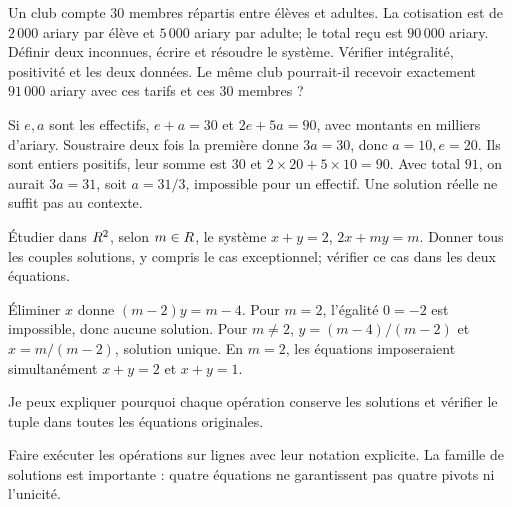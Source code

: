 \label{t11s-c09-p01}
Un club compte $30$ membres répartis entre élèves et adultes. La cotisation est de $2\,000$ ariary par élève et $5\,000$ ariary par adulte; le total reçu est $90\,000$ ariary. Définir deux inconnues, écrire et résoudre le système. Vérifier intégralité, positivité et les deux données. Le même club pourrait-il recevoir exactement $91\,000$ ariary avec ces tarifs et ces $30$ membres ?
\begin{corrige}\label{sol-t11s-c09-p01}
Si $e,a$ sont les effectifs, $e+a=30$ et $2e+5a=90$, avec montants en milliers d’ariary. Soustraire deux fois la première donne $3a=30$, donc $a=10,e=20$. Ils sont entiers positifs, leur somme est $30$ et $2\times20+5\times10=90$. Avec total $91$, on aurait $3a=31$, soit $a=31/3$, impossible pour un effectif. Une solution réelle ne suffit pas au contexte.
\end{corrige}
\label{t11s-c09-p02}
Étudier dans $R^2$, selon $m\in R$, le système $x+y=2$, $2x+my=m$. Donner tous les couples solutions, y compris le cas exceptionnel; vérifier ce cas dans les deux équations.
\begin{corrige}\label{sol-t11s-c09-p02}
Éliminer $x$ donne $(m-2)y=m-4$. Pour $m=2$, l’égalité $0=-2$ est impossible, donc aucune solution. Pour $m\ne2$, $y=(m-4)/(m-2)$ et $x=m/(m-2)$, solution unique. En $m=2$, les équations imposeraient simultanément $x+y=2$ et $x+y=1$.
\end{corrige}

\begin{jemeteste}Je peux expliquer pourquoi chaque opération conserve les solutions et vérifier le tuple dans toutes les équations originales.\end{jemeteste}
\begin{notepourlaclasse}Faire exécuter les opérations sur lignes avec leur notation explicite. La famille de solutions est importante : quatre équations ne garantissent pas quatre pivots ni l’unicité.\end{notepourlaclasse}
